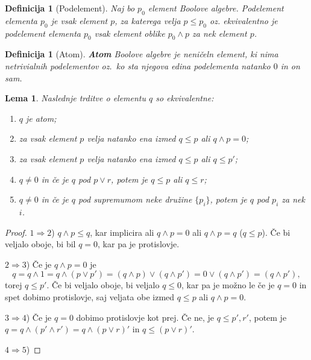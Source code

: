 \documentclass{amsart}
\newtheorem{lema}[izrek]{Lema}
\newtheorem{definicija}[izrek]{Definicija}
\begin{document}
\begin{definicija}[Podelement]
    Naj bo $p_0$ element Boolove algebre. Podelement elementa $p_0$ je vsak element
    \(p\), za katerega velja \(p \leq p_0\) oz. ekvivalentno je podelement elementa $p_0$ vsak element oblike
    \(p_0 \wedge p\) za nek element \(p\).
\end{definicija}

\begin{definicija}[Atom]
    {\bf Atom} Boolove algebre je neničeln element, ki nima netrivialnih podelementov oz.\ ko sta njegova edina podelementa natanko $0$ in on sam.
\end{definicija}

\begin{lema}
    Naslednje trditve o elementu $q$ so ekvivalentne:
    \begin{enumerate}
        \item $q$ je atom;
        \item za vsak element $p$ velja natanko ena izmed \(q \leq p\) ali \(q \wedge p = 0\);
        \item za vsak element $p$ velja natanko ena izmed \(q \leq p\) ali \(q \leq p'\);
        \item \(q \neq 0\) in če je $q$ pod \(p \vee r\), potem je \(q \leq p\) ali \(q \leq r\);
        \item \(q \neq 0\) in če je $q$ pod supremumom neke družine \(\{p_i\}\), potem je \(q\) pod \(p_i\) za nek \(i\).
    \end{enumerate}
\end{lema}

\begin{proof} 
    \(1 \Rightarrow 2\)) \(q \wedge p \leq q\), kar implicira ali
    \(q \wedge p = 0\) ali \(q \wedge p = q\) (\(q \leq p\)). Če bi veljalo oboje, bi bil
    $q = 0$, kar pa je protislovje. 

    \(2 \Rightarrow 3\)) Če je \(q \wedge p = 0\) je 
    \[q = q \wedge 1 = q \wedge \left(p \vee p'\right) = \left(q \wedge p\right)
    \vee \left(q \wedge p'\right) = 0 \vee \left(q \wedge p'\right) = 
    \left(q \wedge p'\right),\]
    torej \(q \leq p'\). Če bi veljalo oboje, bi veljalo \(q \leq 0\), kar pa je možno le če 
    je $q = 0$ in spet dobimo protislovje, saj veljata obe izmed \(q \leq p\) ali \(q \wedge p = 0\).

    \(3 \Rightarrow 4\)) Če je \(q = 0\) dobimo protislovje kot prej. Če ne, je \(q \leq p', r'\), potem je 
    \(q = q \wedge (p' \wedge r') = q \wedge (p \vee r)'\) in \(q \leq (p \vee r)'\).

    \(4 \Rightarrow 5\))

\end{proof}
\end{document}
